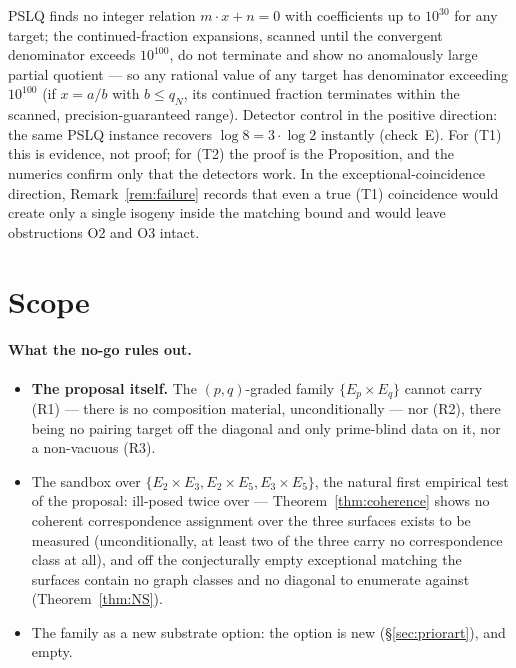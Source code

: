\documentclass[11pt]{article}
\theoremstyle{definition}
\theoremstyle{remark}
\begin{document}
PSLQ finds no integer relation $m\cdot x + n = 0$ with coefficients up to
$10^{30}$ for any target; the continued-fraction expansions, scanned until
the convergent denominator exceeds $10^{100}$, do not terminate and show no
anomalously large partial quotient --- so any rational value of any target
has denominator exceeding $10^{100}$ (if $x = a/b$ with $b \leq q_N$, its
continued fraction terminates within the scanned, precision-guaranteed
range). Detector control in the positive direction: the same PSLQ instance
recovers $\log 8 = 3\cdot\log 2$ instantly (check~E). For (T1) this is
evidence, not proof; for (T2) the proof is the Proposition, and the numerics
confirm only that the detectors work. In the exceptional-coincidence
direction, Remark~\ref{rem:failure} records that even a true (T1) coincidence
would create only a single isogeny inside the matching bound and would leave
obstructions O2 and O3 intact.

\section{Scope}
\label{sec:scope}

\paragraph{What the no-go rules out.}
\begin{itemize}
\item \textbf{The proposal itself.} The $(p,q)$-graded family
$\{E_p \times E_q\}$ cannot carry (R1) --- there is no composition material,
unconditionally --- nor (R2), there being no pairing target off the diagonal and
only prime-blind data on it, nor a non-vacuous (R3).
\item The sandbox over
$\{E_2\times E_3, E_2\times E_5, E_3\times E_5\}$, the natural first
empirical test of the proposal: ill-posed twice over ---
Theorem~\ref{thm:coherence} shows no coherent correspondence assignment over
the three surfaces exists to be measured (unconditionally, at least two of
the three carry no correspondence class at all), and off the conjecturally
empty exceptional matching the surfaces contain no graph classes and no
diagonal to enumerate against (Theorem~\ref{thm:NS}).
\item The family as a new substrate option: the option is new
(\S\ref{sec:priorart}), and empty.
\end{itemize}
\end{document}
